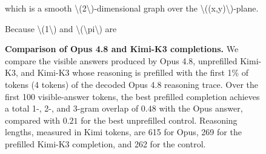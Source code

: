 \begin{figure}[t]
\begin{answercol}[equal height group=ansX1]
  which is a smooth \textbackslash{}(2\textbackslash{})-dimensional graph over the \textbackslash{}((x,y)\textbackslash{})-plane.\par\vspace{2pt}
  Because \textbackslash{}(1\textbackslash{}) and \textbackslash{}(\textbackslash{}pi\textbackslash{}) are\par\vspace{3pt}\elide
\end{answercol}
\caption{\textbf{Comparison of Opus 4.8 and Kimi-K3 completions.} We compare
the visible answers produced by Opus 4.8, unprefilled Kimi-K3, and Kimi-K3
whose reasoning is prefilled with the first 1\% of tokens (4 tokens) of the decoded Opus 4.8 reasoning trace. Over the first 100 visible-answer tokens, the best
prefilled completion achieves a total 1-, 2-, and 3-gram overlap of $0.48$
with the Opus answer, compared with $0.21$ for the best unprefilled
control. Reasoning lengths, measured in Kimi tokens, are 615 for Opus,
269 for the prefilled Kimi-K3 completion, and 262 for the control.}
\label{fig:exhibit_X1}
\end{figure}


